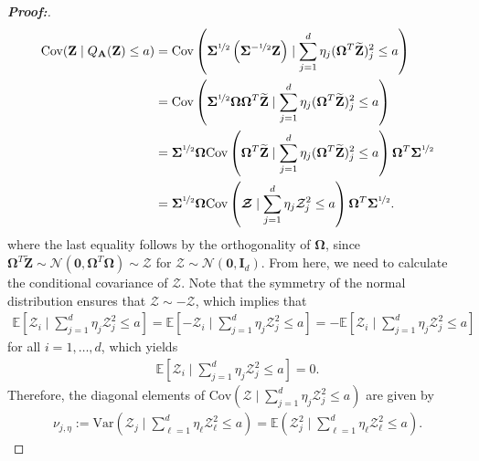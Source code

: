 \documentclass[11pt,twoside]{article}
\theoremstyle{definition}
\theoremstyle{remark}
\begin{document}
\begin{proof}[\textbf{Proof:}]
\begin{align*}
     \text{Cov}( \mathbf{Z} \mid Q_{\mathbf{A}}(\mathbf{Z}) \leq a)  &= \text{Cov}\left(\mathbf{\Sigma}^{\nicefrac{1}{2}} \left(\mathbf{\Sigma}^{-\nicefrac{1}{2}} \mathbf{Z} \right) \mid  \sum^d_{j=1} \eta_j (\mathbf{\Omega}^T \widetilde{\mathbf{Z}})^2_j \leq a\right) \\
     &= \text{Cov}\left(\mathbf{\Sigma}^{\nicefrac{1}{2}} \mathbf{\Omega} \mathbf{\Omega}^T \widetilde{\mathbf{Z}} \mid  \sum^d_{j=1} \eta_j (\mathbf{\Omega}^T \widetilde{\mathbf{Z}})^2_j \leq a\right) \\
     &= \mathbf{\Sigma}^{\nicefrac{1}{2}} \mathbf{\Omega} \text{Cov}\left( \mathbf{\Omega}^T \widetilde{\mathbf{Z}} \mid \sum^d_{j=1} \eta_j (\mathbf{\Omega}^T \widetilde{\mathbf{Z}})^2_j \leq a\right)\mathbf{\Omega}^T  \mathbf{\Sigma}^{\nicefrac{1}{2}} \\
     &= \mathbf{\Sigma}^{\nicefrac{1}{2}} \mathbf{\Omega} \text{Cov}\left( \bm{\mathcal{Z}} \mid  \sum^d_{j=1} \eta_j \mathcal{Z}^2_j \leq a\right)\mathbf{\Omega}^T  \mathbf{\Sigma}^{\nicefrac{1}{2}}.
\end{align*}
where the last equality follows by the orthogonality of $\mathbf{\Omega}$, since $\mathbf{\Omega}^T \widetilde{\mathbf{Z}} \sim \mathcal{N}(\mathbf{0}, \mathbf{\Omega}^T \mathbf{\Omega}) \sim \bm{\mathcal{Z}}$ for $\bm{\mathcal{Z}} \sim \mathcal{N}(\mathbf{0}, \mathbf{I}_d)$. From here, we need to calculate the conditional covariance of $\bm{\mathcal{Z}}$. Note that the symmetry of the normal distribution ensures that $\bm{\mathcal{Z}} \sim - \bm{\mathcal{Z}}$, which implies that
\begin{align*}
    \mathbb{E}\left[\mathcal{Z}_i \mid   \sum^d_{j=1} \eta_j \mathcal{Z}^2_j \leq a \right] = \mathbb{E}\left[-\mathcal{Z}_i \mid   \sum^d_{j=1} \eta_j \mathcal{Z}^2_j \leq a \right] = - \mathbb{E}\left[\mathcal{Z}_i \mid   \sum^d_{j=1} \eta_j \mathcal{Z}^2_j \leq a \right]
\end{align*}
for all $i = 1, \ldots, d$, which yields
\begin{align*}
     \mathbb{E}\left[\mathcal{Z}_i \mid   \sum^d_{j=1} \eta_j \mathcal{Z}^2_j \leq a \right] = 0.
\end{align*}
Therefore, the diagonal elements of $\text{Cov}(\bm{\mathcal{Z}} \mid   \sum^d_{j=1} \eta_j \mathcal{Z}^2_j \leq a)$ are given by
\begin{align*}
    \nu_{j, \eta} := \text{Var}\left(\mathcal{Z}_j \mid   \sum^d_{\ell=1} \eta_\ell \mathcal{Z}^2_\ell \leq a\right) = \mathbb{E}\left(\mathcal{Z}^2_j \mid   \sum^d_{\ell=1} \eta_\ell \mathcal{Z}^2_\ell \leq a\right).

\end{align*}
\end{proof}
\end{document}

